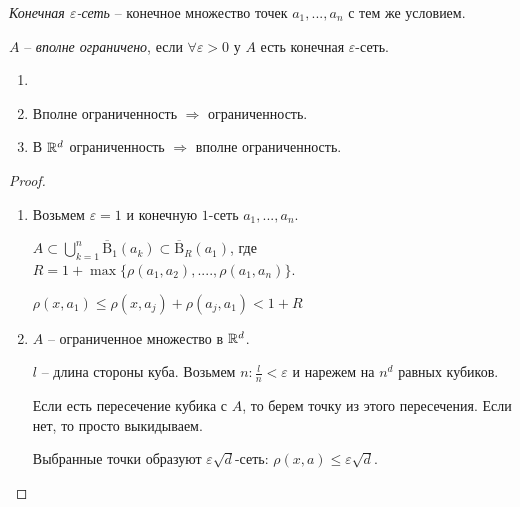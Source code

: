 \begin{definition}
    \textit{Конечная $\varepsilon$-сеть} – конечное множество точек $a_1, ..., a_n$ с тем же условием.
\end{definition}

\begin{definition}
    $A$ – \textit{вполне ограничено}, если $\forall\varepsilon>0$ у $A$ есть конечная $\varepsilon$-сеть.
\end{definition}

\begin{statement}
    \begin{enumerate}
        \item[]
        \item Вполне ограниченность $\Rightarrow$ ограниченность.
        \item В $\mathbb{R}^d$ ограниченность $\Rightarrow$ вполне ограниченность.
    \end{enumerate}
\end{statement}

\begin{proof}~
    \begin{enumerate}
        \item Возьмем $\varepsilon=1$ и конечную $1$-сеть  $a_1, ..., a_n$.

        $A\subset \bigcup\limits_{k=1}^n\overline{\text{B}}_1 (a_k)\subset \overline{\text{B}}_R(a_1)$, где $R=1+\max \{\rho(a_1, a_2), . ..., \rho(a_1, a_n)\}$.

        $\rho(x, a_1)\leq \rho(x, a_j)+\rho(a_j, a_1)<1+R$

        \item
        $A$ – ограниченное множество в $\mathbb{R}^d$.

        $l$ – длина стороны куба. Возьмем $n:\frac{l}{n}<\varepsilon$ и нарежем на $n^d$ равных кубиков.

        Если есть пересечение кубика с $A$, то берем точку из этого пересечения. Если нет, то просто выкидываем.

        Выбранные точки образуют $\varepsilon \sqrt{d}$-сеть: $\rho(x, a)\leq \varepsilon \sqrt{d}$.
    \end{enumerate}
\end{proof}